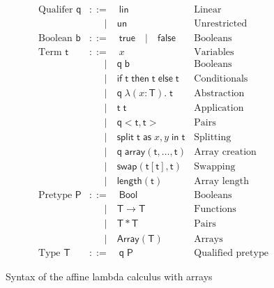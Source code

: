 \documentclass[10pt, english, a4paper]{article}
\begin{document}
\begin{figure}
\begin{align*}
\text{Qualifer }\mathsf{q} &::=\quad\mathsf{lin}&\text{Linear}\\
                           &\quad\;\;|\quad\mathsf{un}&\text{Unrestricted}\\
\text{Boolean }\mathsf{b}  &::=\quad \mathsf{true}\quad|\quad\mathsf{false}&\text{Booleans}\\
\text{Term }\mathsf{t}     &::=\quad x &\text{Variables}\\
                           &\quad\;\;|\quad\mathsf{q}\;\mathsf{b}&\text{Booleans}\\
                           &\quad\;\;|\quad \mathsf{if}\;\mathsf{t}\;\mathsf{then}\;\mathsf{t}\;\mathsf{else}\;\mathsf{t}&\text{Conditionals}\\
                           &\quad\;\;|\quad \mathsf{q}\;\lambda(x:\mathsf{T}).\;\mathsf{t}&\text{Abstraction}\\
                           &\quad\;\;|\quad\mathsf{t}\;\mathsf{t}&\text{Application}\\
                           &\quad\;\;|\quad\mathsf{q}<\mathsf{t},\mathsf{t}>&\text{Pairs}\\
                           &\quad\;\;|\quad\mathsf{split}\;\mathsf{t}\;\mathsf{as}\;x,y\;\mathsf{in}\;\mathsf{t}&\text{Splitting}\\
                           &\quad\;\;|\quad\mathsf{q}\;\mathsf{array}(\mathsf{t},\ldots,\mathsf{t})&\text{Array creation}\\
                           &\quad\;\;|\quad \mathsf{swap}(\mathsf{t}[\mathsf{t}], \mathsf{t})&\text{Swapping}\\
                           &\quad\;\;|\quad \mathsf{length}(\mathsf{t})&\text{Array length}\\
\text{Pretype }\mathsf{P}  &::= \quad\mathsf{Bool}&\text{Booleans}\\
                           &\quad\;\;|\quad\mathsf{T}\rightarrow\mathsf{T}&\text{Functions}\\
                           &\quad\;\;|\quad\mathsf{T}*\mathsf{T}&\text{Pairs}\\
                           &\quad\;\;|\quad\mathsf{Array} (\mathsf{T})&\text{Arrays}\\
\text{Type }\mathsf{T}      &::=\quad\mathsf{q}\;\mathsf{P}&\text{Qualified pretype}
\end{align*}
\caption{Syntax of the affine lambda calculus with arrays}
\end{figure}
\end{document}

